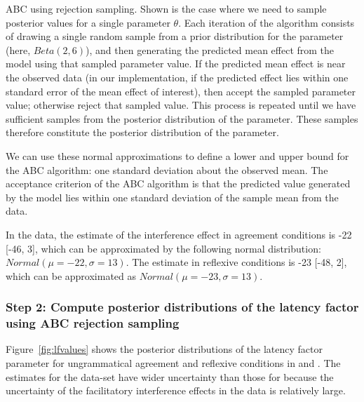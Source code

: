 \documentclass{cambridge7A}\usepackage[]{graphicx}\usepackage[]{color}
\begin{document}
\begin{algorithm}[H]
\SetAlgoLined
\caption{ABC using rejection sampling. Shown is the case where we need to sample posterior values for a single parameter $\theta$. Each iteration of the  algorithm consists of drawing a single random sample from a prior distribution for the parameter (here, $Beta(2,6)$), and then generating the predicted mean effect from the model using that sampled parameter value. If the predicted mean effect is near the observed data (in our implementation, if the predicted effect lies within one standard error of the mean effect of interest), then accept the sampled parameter value; otherwise reject that sampled value. This process is repeated until we have sufficient samples from the posterior distribution of the parameter. These samples therefore constitute the posterior distribution of the parameter.} \label{alg:abcrejection}
\end{algorithm}

We can use these normal approximations to define a lower and upper bound for the ABC algorithm: one standard deviation about the observed mean. The acceptance criterion of the ABC algorithm is that the predicted value generated by the model lies within one standard deviation of the sample mean from the data.



In the \cite{JaegerMertzenVanDykeVasishth2019} data, 
the estimate of the interference effect in agreement conditions is -22 [-46, 3], which can be approximated by the following normal distribution: $Normal(\mu=-22,\sigma=13)$. The estimate in reflexive conditions is -23 [-48, 2], which can be approximated as  $Normal(\mu=-23,\sigma=13)$.
  


\subsubsection{Step 2: Compute posterior distributions of the latency factor using ABC rejection sampling}

Figure~\ref{fig:lfvalues} shows the posterior distributions of the latency factor parameter for ungrammatical agreement and reflexive conditions in \cite{DillonMishlerSloggett2013} and \cite{JaegerMertzenVanDykeVasishth2019}. The estimates for the \cite{DillonMishlerSloggett2013} data-set have wider uncertainty than those for \cite{JaegerMertzenVanDykeVasishth2019} because the uncertainty of the facilitatory interference effects in the data is relatively large.
\end{document}
